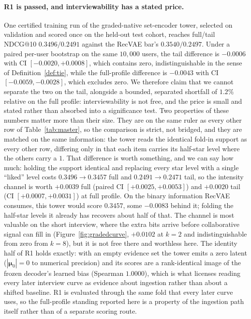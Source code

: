 \documentclass[manuscript,screen]{acmart}
\newcommand{\bmu}{\boldsymbol{\mu}}
\begin{document}
\paragraph{R1 is passed, and interviewability has a stated price.} One certified training run of the graded-native set-encoder tower, selected on validation and scored once on the held-out test cohort, reaches full/tail NDCG@10 $\mathbf{0.3496/0.2491}$ against the RecVAE bar's $0.3540/0.2497$. Under a paired per-user bootstrap on the same $10{,}000$ users, the tail difference is $-0.0006$ with CI $[-0.0020,+0.0008]$, which contains zero, indistinguishable in the sense of Definition~\ref{def:tie}, while the full-profile difference is $-0.0043$ with CI $[-0.0059,-0.0028]$, which excludes zero. We therefore claim that we cannot separate the two on the tail, alongside a bounded, separated shortfall of $1.2\%$ relative on the full profile: interviewability is not free, and the price is small and stated rather than absorbed into a significance test. Two properties of these numbers matter more than their size. They are on the same ruler as every other row of Table~\ref{tab:master}, so the comparison is strict, not bridged, and they are matched on the same information: the tower reads the identical fold-in support as every other row, differing only in that each item carries its half-star level where the others carry a $1$. That difference is worth something, and we can say how much: holding the support identical and replacing every star level with a single ``liked'' level costs $0.3496\rightarrow0.3457$ full and $0.2491\rightarrow0.2471$ tail, so the intensity channel is worth $+0.0039$ full (paired CI $[+0.0025,+0.0053]$) and $+0.0020$ tail (CI $[+0.0007,+0.0031]$) at full profile. On the binary information RecVAE consumes, this tower would score $0.3457$, some $-0.0083$ behind it; folding the half-star levels it already has recovers about half of that. The channel is most valuable on the short interview, where the extra bits arrive before collaborative signal can fill in (Figure~\ref{fig:gradedcurve}, $+0.0102$ at $k{=}2$ and indistinguishable from zero from $k{=}8$), but it is not free there and worthless here. The identity half of R1 holds exactly: with an empty evidence set the tower emits a zero latent ($|\bmu_0|=0$ to numerical precision) and its scores are a rank-identical image of the frozen decoder's learned bias (Spearman $1.0000$), which is what licenses reading every later interview curve as evidence about ingestion rather than about a shifted baseline. R1 is evaluated through the same fold that every later curve uses, so the full-profile standing reported here is a property of the ingestion path itself rather than of a separate scoring route.
\end{document}
